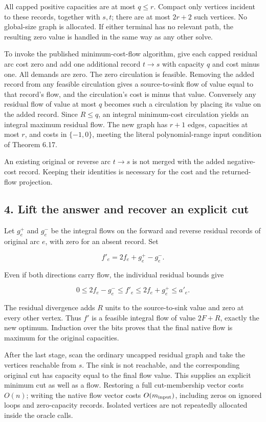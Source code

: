 All capped positive capacities are at most \(q\leq r\). Compact only vertices incident to these records, together with \(s,t\); there are at most \(2r+2\) such vertices. No global-size graph is allocated. If either terminal has no relevant path, the resulting zero value is handled in the same way as any other solve.

To invoke the published minimum-cost-flow algorithm, give each capped residual arc cost zero and add one additional record \(t\to s\) with capacity \(q\) and cost minus one. All demands are zero. The zero circulation is feasible. Removing the added record from any feasible circulation gives a source-to-sink flow of value equal to that record's flow, and the circulation's cost is minus that value. Conversely any residual flow of value at most \(q\) becomes such a circulation by placing its value on the added record. Since \(R\leq q\), an integral minimum-cost circulation yields an integral maximum residual flow. The new graph has \(r+1\) edges, capacities at most \(r\), and costs in \(\{-1,0\}\), meeting the literal polynomial-range input condition of Theorem 6.17.

An existing original or reverse arc \(t\to s\) is not merged with the added negative-cost record. Keeping their identities is necessary for the cost and the returned-flow projection.

\hypertarget{af-bcf24248b3-lift-the-answer-and-recover-an-explicit-cut}{%
\subsection{4. Lift the answer and recover an explicit cut}\label{af-bcf24248b3-lift-the-answer-and-recover-an-explicit-cut}}

Let \(g_e^+\) and \(g_e^-\) be the integral flows on the forward and reverse residual records of original arc \(e\), with zero for an absent record. Set

\[
f'_e=2f_e+g_e^+-g_e^-.
\]

Even if both directions carry flow, the individual residual bounds give

\[
0\leq2f_e-g_e^-\leq f'_e
 \leq2f_e+g_e^+\leq a'_e.
\]

The residual divergence adds \(R\) units to the source-to-sink value and zero at every other vertex. Thus \(f'\) is a feasible integral flow of value \(2F+R\), exactly the new optimum. Induction over the bits proves that the final native flow is maximum for the original capacities.

After the last stage, scan the ordinary uncapped residual graph and take the vertices reachable from \(s\). The sink is not reachable, and the corresponding original cut has capacity equal to the final flow value. This supplies an explicit minimum cut as well as a flow. Restoring a full cut-membership vector costs \(O(n)\); writing the native flow vector costs \(O(m_{\rm input})\), including zeros on ignored loops and zero-capacity records. Isolated vertices are not repeatedly allocated inside the oracle calls.

